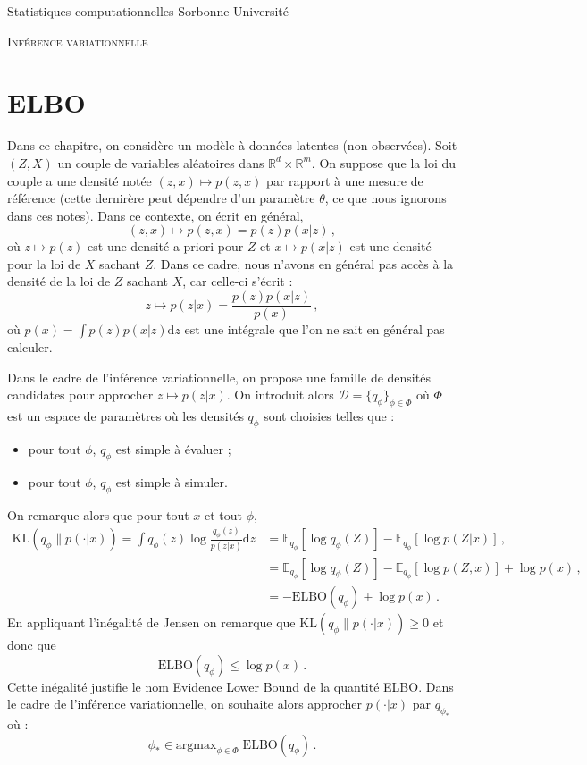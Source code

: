 \documentclass[a4paper,10pt,fleqn]{article}
\newcommand{\1}{\ensuremath{\mathbbm{1}}}
\begin{document}
\noindent Statistiques computationnelles \hfill Sorbonne Universit\'e 

\noindent\hrulefill

\begin{center}
\textsc{Inf\'erence variationnelle}
\end{center}
\hrulefill

\medskip

\section*{ELBO}
Dans ce chapitre, on consid\`ere un mod\`ele \`a donn\'ees latentes (non observ\'ees). Soit $(Z,X)$ un couple de variables al\'eatoires dans $\mathbb{R}^d\times \mathbb{R}^m$. On suppose que la loi du couple a une densit\'e not\'ee $(z,x)\mapsto p(z,x)$ par rapport \`a une mesure de r\'ef\'erence (cette dernir\`ere peut d\'ependre d'un param\`etre $\theta$, ce que nous ignorons dans ces notes). Dans ce contexte, on \'ecrit en g\'en\'eral,
$$
(z,x)\mapsto p(z,x) = p(z)p(x|z)\,,
$$
o\`u $z\mapsto p(z)$ est une densit\'e a priori pour $Z$ et $x \mapsto p(x|z)$ est une densit\'e pour la loi de $X$ sachant $Z$. Dans ce cadre, nous n'avons en g\'en\'eral pas acc\`es \`a la densit\'e de la loi de $Z$ sachant $X$, car celle-ci s'\'ecrit :
$$
z\mapsto p(z|x) = \frac{p(z)p(x|z)}{p(x)}\,, 
$$
o\`u $p(x) = \int p(z)p(x|z) \mathrm{d} z$ est une int\'egrale que l'on ne sait en g\'en\'eral pas calculer.

\medskip

Dans le cadre de l'inf\'erence variationnelle, on propose une famille de densit\'es candidates pour approcher $z\mapsto p(z|x)$. On introduit alors $\mathcal{D} = \{q_\phi\}_{\phi\in\Phi}$ o\`u $\Phi$ est un espace de param\`etres o\`u les densit\'es $q_\phi$ sont choisies telles que :
\begin{itemize}
\item pour tout $\phi$, $q_\phi$ est simple \`a \'evaluer ;
\item pour tout $\phi$, $q_\phi$ est simple \`a simuler.
\end{itemize}

\medskip

On remarque alors que pour tout $x$ et tout $\phi$,
\begin{align*}
\mathrm{KL}\left(q_\phi\|p(\cdot|x)\right) = \int q_\phi(z) \log \frac{q_\phi(z)}{p(z|x)} \mathrm{d}z&= \mathbb{E}_{q_\phi}[\log q_\phi(Z)] - \mathbb{E}_{q_\phi}[\log p(Z|x)]\,,\\
 &= \mathbb{E}_{q_\phi}[\log q_\phi(Z)] - \mathbb{E}_{q_\phi}[\log p(Z,x)]+\log p(x)\,,\\
&= -\mathrm{ELBO}(q_\phi)+\log p(x)\,.
\end{align*}
En appliquant l'in\'egalit\'e de Jensen on remarque que $\mathrm{KL}\left(q_\phi\|p(\cdot|x)\right) \geq 0$ et donc que 
$$
\mathrm{ELBO}(q_\phi)\leq \log p(x)\,.
$$
Cette in\'egalit\'e justifie le nom Evidence Lower Bound de la quantit\'e ELBO. Dans le cadre de l'inf\'erence variationnelle, on souhaite alors approcher  $p(\cdot|x)$ par $q_{\phi_*}$ o\`u :
$$
\phi_* \in \mathrm{argmax}_{\phi\in\Phi}\;\mathrm{ELBO}(q_\phi)\,.
$$
\end{document}
